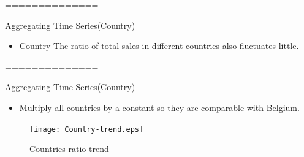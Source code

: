 \documentclass[
 size=14pt,
 paper=smartboard,  %
 mode=present, 		%
 display=slides, 	%
 style=tuliplab,  	%
 pauseslide,
 fleqn,leqno]{powerdot}
\begin{document}
==============
\begin{slide}[toc=,bm=]{Aggregating Time Series(Country)}
	
	\begin{itemize}
		\bigskip
		\item
		Country-The ratio of total sales in different countries also fluctuates little.
	\end{itemize}
	\bigskip
	\begin{center}
	\end{center}
\end{slide}

==============
\begin{slide}[toc=,bm=]{Aggregating Time Series(Country)}
	\begin{itemize}
		\item
		Multiply all countries by a constant so they are comparable with Belgium.
	\end{itemize}
		\begin{figure}
			\centering
			\texttt{[image: Country-trend.eps]}
			\caption{Countries ratio trend}\label{fig:OutAspect-target}
		\end{figure}

\end{slide}
\end{document}
